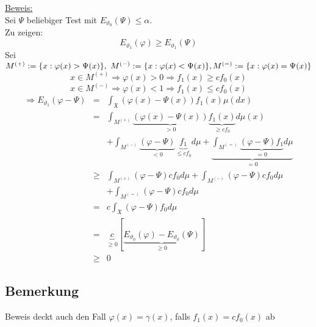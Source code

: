 \documentclass[a4paper,11pt,twoside,titlepage]{article}
\newcommand{\XX}{{\mathfrak X}} %
\begin{document}
\underline{Beweis:}\\
Sei $\Psi$ beliebiger Test mit $E_{\vartheta_0}(\Psi)\leq\alpha$.\\
Zu zeigen:
$$E_{\vartheta_1}(\varphi)\geq E_{\vartheta_1}(\Psi)$$
Sei $M^{(+)}:=\{x:\varphi(x)>\Psi(x)\},\ M^{(-)}:=\{x:\varphi(x)<\Psi(x)\},\\ M^{(=)}:=\{x:\varphi(x)=\Psi(x)\}$
\[x\in M^{(+)}\Rightarrow \varphi(x)>0\Rightarrow f_1(x)\geq cf_0(x)\]
\[x\in M^{(-)}\Rightarrow \varphi(x)<1\Rightarrow f_1(x)\leq cf_0(x)\]
\begin{eqnarray*}
\Rightarrow E_{\vartheta_1}(\varphi-\Psi)&=&\int_\XX (\varphi(x)-\Psi(x)) f_1(x)\mu (dx)\\
&=&\int_{M^{(+)}}\underbrace{(\varphi(x)-\Psi(x))}_{>0}\underbrace{f_1(x)}_{\geq cf_0}d\mu(x)\\
&&+ \int_{M^{(-)}}\underbrace{(\varphi-\Psi)}_{<0}\underbrace{f_1}_{\leq cf_0}d\mu +\underbrace{\int_{M^{(=)}}\underbrace{(\varphi-\Psi)f_1}_{=0}d\mu}_{=0}\\
&\geq&\int_{M^{(+)}}(\varphi-\Psi)cf_0d\mu+\int_{M^{(-)}}(\varphi-\Psi)cf_0d\mu\\
&&+\int_{M^{(=)}}(\varphi-\Psi)cf_0d\mu\\
&=&c\int_\XX(\varphi-\Psi)f_0d\mu\\
&=&\underbrace{c}_{\geq0}[\underbrace{E_{\vartheta_0}(\varphi)-E_{\vartheta_0}(\Psi)}_{\geq 0}]\\&\geq& 0
\end{eqnarray*}

\subsection{Bemerkung}
Beweis deckt auch den Fall $\varphi(x)=\gamma(x)$, falls $f_1(x)=cf_0(x)$ ab
\end{document}
